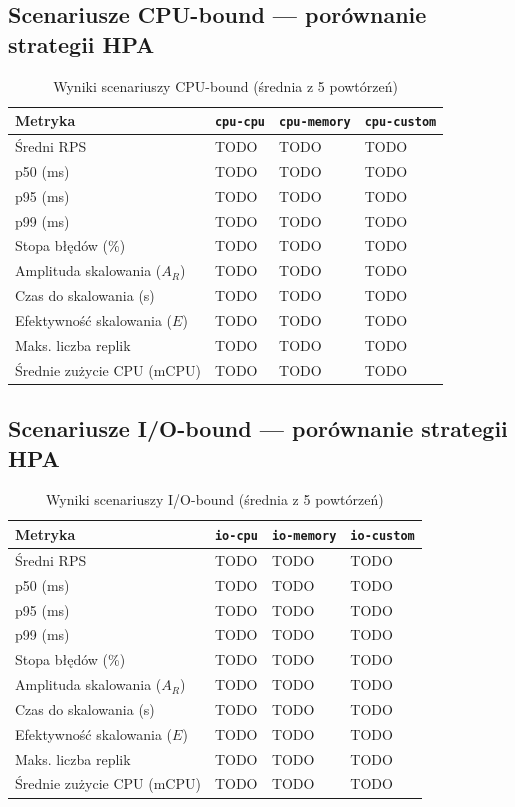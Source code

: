\subsection{Scenariusze CPU-bound — porównanie strategii HPA}

\begin{table}[H]
  \centering
  \begin{tabularx}{\textwidth}{|l|X|X|X|}
    \hline
    \textbf{Metryka} & \texttt{cpu-cpu} & \texttt{cpu-memory} & \texttt{cpu-custom} \\
    \hline
    Średni RPS & TODO & TODO & TODO \\
    p50 (ms) & TODO & TODO & TODO \\
    p95 (ms) & TODO & TODO & TODO \\
    p99 (ms) & TODO & TODO & TODO \\
    Stopa błędów (\%) & TODO & TODO & TODO \\
    Amplituda skalowania ($A_R$) & TODO & TODO & TODO \\
    Czas do skalowania (s) & TODO & TODO & TODO \\
    Efektywność skalowania ($E$) & TODO & TODO & TODO \\
    Maks. liczba replik & TODO & TODO & TODO \\
    Średnie zużycie CPU (mCPU) & TODO & TODO & TODO \\
    \hline
  \end{tabularx}
  \caption{Wyniki scenariuszy CPU-bound (średnia z 5 powtórzeń)}
  \label{tab:cpu-results}
\end{table}

\subsection{Scenariusze I/O-bound — porównanie strategii HPA}

\begin{table}[H]
  \centering
  \begin{tabularx}{\textwidth}{|l|X|X|X|}
    \hline
    \textbf{Metryka} & \texttt{io-cpu} & \texttt{io-memory} & \texttt{io-custom} \\
    \hline
    Średni RPS & TODO & TODO & TODO \\
    p50 (ms) & TODO & TODO & TODO \\
    p95 (ms) & TODO & TODO & TODO \\
    p99 (ms) & TODO & TODO & TODO \\
    Stopa błędów (\%) & TODO & TODO & TODO \\
    Amplituda skalowania ($A_R$) & TODO & TODO & TODO \\
    Czas do skalowania (s) & TODO & TODO & TODO \\
    Efektywność skalowania ($E$) & TODO & TODO & TODO \\
    Maks. liczba replik & TODO & TODO & TODO \\
    Średnie zużycie CPU (mCPU) & TODO & TODO & TODO \\
    \hline
  \end{tabularx}
  \caption{Wyniki scenariuszy I/O-bound (średnia z 5 powtórzeń)}
  \label{tab:io-results}
\end{table}

